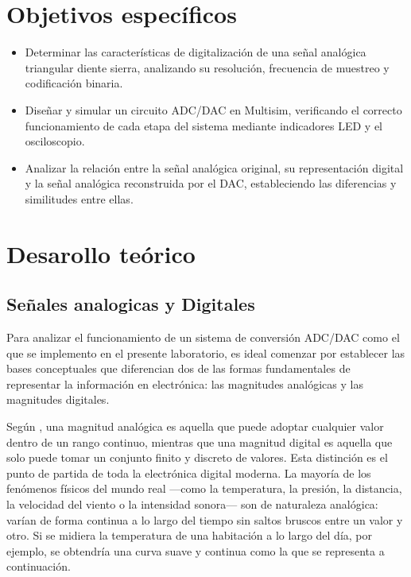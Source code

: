 \documentclass[12pt,letterpaper]{article}
\begin{document}
    \section{Objetivos específicos}
    \begin{itemize}
        \item Determinar las características de digitalización de una señal analógica triangular diente sierra, analizando su resolución, frecuencia de muestreo y codificación binaria. 
        \item Diseñar y simular un circuito ADC/DAC en Multisim, verificando el correcto funcionamiento de cada etapa del sistema mediante indicadores LED y el osciloscopio.
        \item  Analizar la relación entre la señal analógica original, su representación digital y la señal analógica reconstruida por el DAC, estableciendo las diferencias y similitudes entre ellas. 
    \end{itemize}
    

    \newpage

    \section{Desarollo teórico}
    
    \subsection{Señales analogicas y Digitales }
    Para analizar el funcionamiento de un sistema de conversión ADC/DAC como el que se implemento en el presente laboratorio, es ideal comenzar por establecer las bases conceptuales que diferencian dos de las formas fundamentales de representar la información en electrónica: las magnitudes analógicas y las magnitudes digitales. 

    Según \cite{floyd2006fundamentos} , una magnitud analógica es aquella que puede adoptar cualquier valor dentro de un rango continuo, mientras que una magnitud digital es aquella que solo puede tomar un conjunto finito y discreto de valores. Esta distinción es el punto de partida de toda la electrónica digital moderna. La mayoría de los fenómenos físicos del mundo real —como la temperatura, la presión, la distancia, la velocidad del viento o la intensidad sonora— son de naturaleza analógica: varían de forma continua a lo largo del tiempo sin saltos bruscos entre un valor y otro. Si se midiera la temperatura de una habitación a lo largo del día, por ejemplo, se obtendría una curva suave y continua como la que se representa a continuación. 
\end{document}
